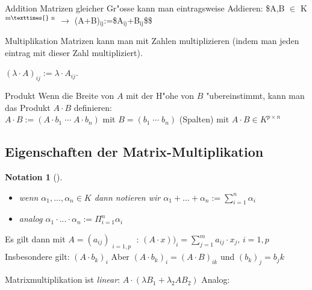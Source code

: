\documentclass[11pt]{article}
\newtheorem*{notation}{Notation}
\begin{document}
\begin{definition}{Addition}{}
Matrizen gleicher Gr"osse kann man eintragsweise Addieren: \$A,B \(\in\) K\(^{\text{m}\texttimes{}\text{
n}}\) \(\rightarrow\) (A+B)\(_{\text{ij}}\):=\$A\(_{\text{ij}}\)+B\(_{\text{ij}}\)\$\$
\end{definition}

\begin{definition}{Multiplikation}{}
Matrizen kann man mit Zahlen multiplizieren (indem man jeden eintrag mit dieser
Zahl multipliziert).

\((\lambda \cdot A)_{ij}:=\lambda \cdot A_{ij}\).
\end{definition}

\begin{definition}{Produkt}{}
Wenn die Breite von \(A\) mit der H"ohe von \(B\) "ubereinstimmt, kann man das
Produkt \(A\cdot B\) definieren: \\
\(A\cdot B:=(A\cdot b_1\; \cdots \; A\cdot b_n)\) mit \(B=(b_1\; \cdots\; b_n)\) (Spalten)
mit \(A\cdot B \in K^{p\times n}\)
\end{definition}

\subsection{Eigenschaften der Matrix-Multiplikation}
\label{sec:org8eaaee0}
\begin{notation}[] \label{}
\begin{itemize}
\item wenn \(\alpha_1,...,\alpha_n\in K\) dann notieren wir \(\alpha_1+...+\alpha_n :=
   \sum_{i=1}^{n}{\alpha_i}\)
\item analog \(\alpha_1\cdot ...\cdot\alpha_n := \Pi_{i=1}^{n}{\alpha_i}\)
\end{itemize}
\end{notation}

\begin{relation}
Es gilt dann mit \(A=(a_{ij})_{\substack{i=1,p}}\) : \((A\cdot
x))_i=\sum_{j=1}^{m}{a_{ij}\cdot x_j,\, i=1,p}\) \\

Insbesondere gilt: \((A\cdot b_k)_i\) Aber \((A\cdot b_k)_i = (A\cdot B)_{ik}\) und \((b_k)_j=b_jk\)
\end{relation}

\begin{relation}
Matrixmultiplikation ist \emph{linear}: \(A\cdot (\lambda B_1 + \lambda_2 A B_2)\)
Analog:
\end{relation}
\end{document}
